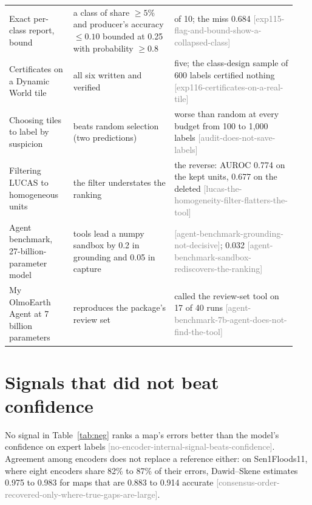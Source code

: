 \documentclass[11pt,a4paper]{article}
\makeatletter
\newcommand{\claim}[1]{{\scriptsize\textsf{\textcolor{gray}{[#1]}}}}
\providecommand{\FloatBarrier}{\par\begingroup\let\@elt\relax
  \edef\@tempa{\@botlist\@deferlist\@dbldeferlist}\ifx\@tempa\@empty\else\clearpage\fi\endgroup}
\makeatother
\begin{document}
{\begin{longtable}{@{}>{\raggedright\arraybackslash}p{0.21\linewidth}>{\raggedright\arraybackslash}p{0.33\linewidth}>{\raggedright\arraybackslash}p{0.40\linewidth}@{}}
Exact per-class report, bound & a class of share $\ge 5\%$ and producer's accuracy $\le 0.10$ bounded at 0.25 with probability $\ge 0.8$ & 9 of 10; the miss 0.684 \claim{exp115-flag-and-bound-show-a-collapsed-class} \\
Certificates on a Dynamic World tile & all six written and verified & five; the class-design sample of 600 labels certified nothing \claim{exp116-certificates-on-a-real-tile} \\
\midrule
Choosing tiles to label by suspicion & beats random selection (two predictions) & worse than random at every budget from 100 to 1,000 labels \claim{audit-does-not-save-labels} \\
Filtering LUCAS to homogeneous units & the filter understates the ranking & the reverse: AUROC 0.774 on the kept units, 0.677 on the deleted \claim{lucas-the-homogeneity-filter-flatters-the-tool} \\
Agent benchmark, 27-billion-parameter model & tools lead a numpy sandbox by 0.2 in grounding and 0.05 in capture & 0.052 \claim{agent-benchmark-grounding-not-decisive}; 0.032 \claim{agent-benchmark-sandbox-rediscovers-the-ranking} \\
My OlmoEarth Agent at 7 billion parameters & reproduces the package's review set & called the review-set tool on 17 of 40 runs \claim{agent-benchmark-7b-agent-does-not-find-the-tool} \\
\end{longtable}
}

\FloatBarrier

\section{Signals that did not beat confidence}
\label{sec:neg}

No signal in Table~\ref{tab:neg} ranks a map's errors better than the model's confidence on expert labels
\claim{no-encoder-internal-signal-beats-confidence}. Agreement among encoders does not replace a reference either: on
Sen1Floods11, where eight encoders share 82\% to 87\% of their errors, Dawid--Skene \citep{dawid1979} estimates 0.975
to 0.983 for maps that are 0.883 to 0.914 accurate \claim{consensus-order-recovered-only-where-true-gaps-are-large}.
\end{document}
